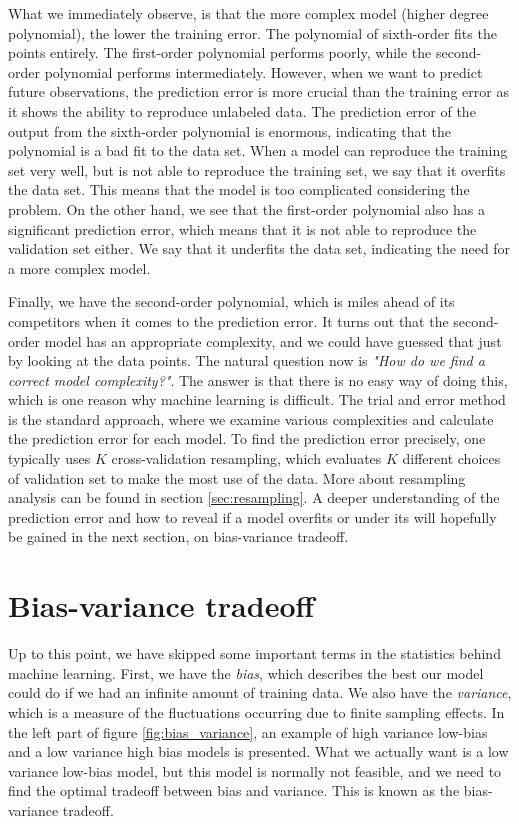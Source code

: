 What we immediately observe, is that the more complex model (higher degree polynomial), the lower the training error. The polynomial of sixth-order fits the points entirely. The first-order polynomial performs poorly, while the second-order polynomial performs intermediately. However, when we want to predict future observations, the prediction error is more crucial than the training error as it shows the ability to reproduce unlabeled data. The prediction error of the output from the sixth-order polynomial is enormous, indicating that the polynomial is a bad fit to the data set. When a model can reproduce the training set very well, but is not able to reproduce the training set, we say that it overfits the data set. This means that the model is too complicated considering the problem. On the other hand, we see that the first-order polynomial also has a significant prediction error, which means that it is not able to reproduce the validation set either. We say that it underfits the data set, indicating the need for a more complex model.

Finally, we have the second-order polynomial, which is miles ahead of its competitors when it comes to the prediction error. It turns out that the second-order model has an appropriate complexity, and we could have guessed that just by looking at the data points. The natural question now is \textit{"How do we find a correct model complexity?"}. The answer is that there is no easy way of doing this, which is one reason why machine learning is difficult. The trial and error method is the standard approach, where we examine various complexities and calculate the prediction error for each model. To find the prediction error precisely, one typically uses $K$ cross-validation resampling, which evaluates $K$ different choices of validation set to make the most use of the data. More about resampling analysis can be found in section \ref{sec:resampling}. A deeper understanding of the prediction error and how to reveal if a model overfits or under its will hopefully be gained in the next section, on bias-variance tradeoff. 

\section{Bias-variance tradeoff}
Up to this point, we have skipped some important terms in the statistics behind machine learning. First, we have the \textit{bias}, which describes the best our model could do if we had an infinite amount of training data. We also have the \textit{variance}, which is a measure of the fluctuations occurring due to finite sampling effects. In the left part of figure \eqref{fig:bias_variance}, an example of high variance low-bias and a low variance high bias models is presented. What we actually want is a low variance low-bias model, but this model is normally not feasible, and we need to find the optimal tradeoff between bias and variance. This is known as the bias-variance tradeoff. 

